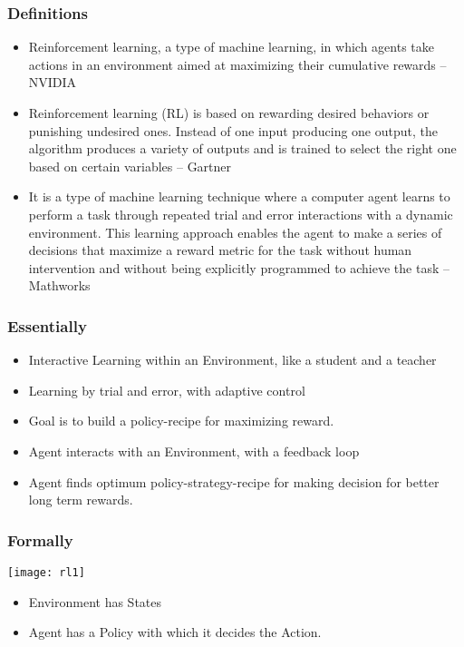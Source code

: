 \begin{frame}[fragile]\frametitle{Definitions}
\begin{itemize}
\item Reinforcement learning, a type of machine learning, in which agents take actions in an environment aimed at maximizing their cumulative rewards – NVIDIA

\item Reinforcement learning (RL) is based on rewarding desired behaviors or punishing undesired ones. Instead of one input producing one output, the algorithm produces a variety of outputs and is trained to select the right one based on certain variables – Gartner

\item It is a type of machine learning technique where a computer agent learns to perform a task through repeated trial and error interactions with a dynamic environment. This learning approach enables the agent to make a series of decisions that maximize a reward metric for the task without human intervention and without being explicitly programmed to achieve the task – Mathworks
\end{itemize}
\end{frame}

\begin{frame}[fragile]\frametitle{Essentially}
\begin{itemize}
\item Interactive Learning within an Environment, like a student and a teacher
\item Learning by trial and error, with adaptive control
\item Goal is to build a policy-recipe for maximizing reward.
\item Agent interacts with an Environment, with a feedback loop
\item Agent finds optimum policy-strategy-recipe for making decision for better long term rewards.
\end{itemize}
\end{frame}


\begin{frame}[fragile]\frametitle{Formally}
\begin{center}
\texttt{[image: rl1]}
\end{center}

\begin{itemize}
\item Environment has States
\item Agent has a Policy with which it decides the Action.
\end{itemize}
\end{frame}


